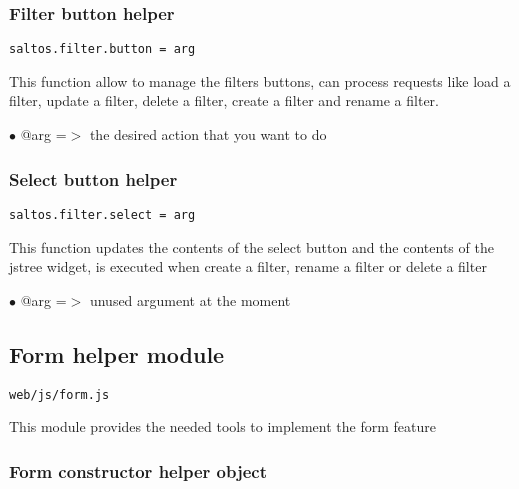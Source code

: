 \documentclass[a4paper]{article}
\begin{document}
\subsubsection{Filter button helper}

\begin{lstlisting}
saltos.filter.button = arg
\end{lstlisting}

This function allow to manage the filters buttons, can process requests
like load a filter, update a filter, delete a filter, create a filter and
rename a filter.

\begin{compactitem}
\item[\color{myblue}$\bullet$] @arg =$>$ the desired action that you want to do
\end{compactitem}

\hypertarget{toc772}{}
\subsubsection{Select button helper}

\begin{lstlisting}
saltos.filter.select = arg
\end{lstlisting}

This function updates the contents of the select button and the contents of
the jstree widget, is executed when create a filter, rename a filter or delete
a filter

\begin{compactitem}
\item[\color{myblue}$\bullet$] @arg =$>$ unused argument at the moment
\end{compactitem}

\hypertarget{toc773}{}
\subsection{Form helper module}

\begin{lstlisting}
web/js/form.js
\end{lstlisting}

This module provides the needed tools to implement the form feature

\hypertarget{toc774}{}
\subsubsection{Form constructor helper object}
\end{document}
